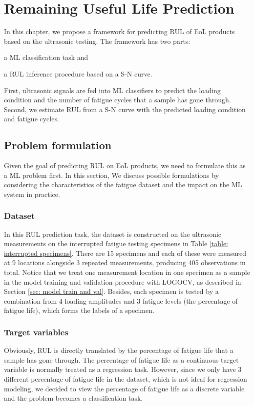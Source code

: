 \chapter{Remaining Useful Life Prediction}
\label{chap: rul}

In this chapter, we propose a framework for predicting RUL of EoL products based on the ultrasonic testing. The framework has two parts: \begin{enumerate*}[label=\itshape\alph*\upshape)]
    \item a ML classification task and
    \item a RUL inference procedure based on a S-N curve.
\end{enumerate*}  First, ultrasonic signals are fed into ML classifiers to predict the loading condition and the number of fatigue cycles that a sample has gone through. Second, we estimate RUL from a S-N curve with the predicted loading condition and fatigue cycles.

\section{Problem formulation}
Given the goal of predicting RUL on EoL products, we need to formulate this as a ML problem first. In this section, We discuss possible formulations by considering the characteristics of the fatigue dataset and the impact on the ML system in practice.

\subsection{Dataset}
In this RUL prediction task, the dataset is constructed on the ultrasonic measurements on the interrupted fatigue testing specimens in Table \ref{table: interrupted specimens}. There are 15 specimens and each of these were measured at 9 locations alongside 3 repeated measurements, producing 405 observations in total. Notice that we treat one measurement location in one specimen as a sample in the model training and validation procedure with LOGOCV, as described in Section \ref{sec: model train and val}. Besides, each specimen is tested by a combination from 4 loading amplitudes and 3 fatigue levels (the percentage of fatigue life), which forms the labels of a specimen.

\subsection{Target variables}
Obviously, RUL is directly translated by the percentage of fatigue life that a sample has gone through. The percentage of fatigue life as a continuous target variable is normally treated as a regression task. However, since we only have 3 different percentage of fatigue life in the dataset, which is not ideal for regression modeling, we decided to view the percentage of fatigue life as a discrete variable and the problem becomes a classification task.

